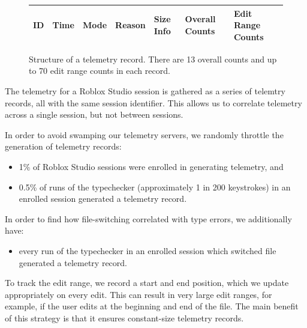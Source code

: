 \documentclass[english,submission,cleveref]{programming}
\begin{document}
\begin{figure}[t]\centering
  \begin{tabular}{|l|l|l|l|l|l|l|}\hline
    ID & Time & Mode & Reason & Size Info & Overall Counts & Edit Range Counts
    \\\toprule
  \end{tabular}
  \caption{Structure of a telemetry record. There are 13 overall counts and up to 70 edit range counts in each record.}
  \label{f:tdata}
\end{figure}

The telemetry for a Roblox Studio session is gathered as a series of
telemtry records, all with the same \panon{} session
identifier. This allows us to correlate telemetry across a single
session, but not between sessions.

In order to avoid swamping our telemetry servers, we randomly throttle
the generation of telemetry records:
\begin{itemize}
  \item
    1\% of Roblox Studio sessions were enrolled in generating telemetry, and
  \item
    0.5\% of runs of the typechecker (approximately 1 in 200 keystrokes)
      in an enrolled session generated a telemetry record.
\end{itemize}
In order to find how file-switching correlated with type errors, we additionally have:
\begin{itemize}
  \item
    every run of the typechecker in an enrolled session which switched file generated a telemetry record.
\end{itemize}

To track the edit range, we record a start and end position, which we
update appropriately on every edit. This can result in very large edit
ranges, for example, if the user edits at the beginning and end of the
file.
The main benefit of this strategy is that it ensures constant-size telemetry records.
\end{document}
